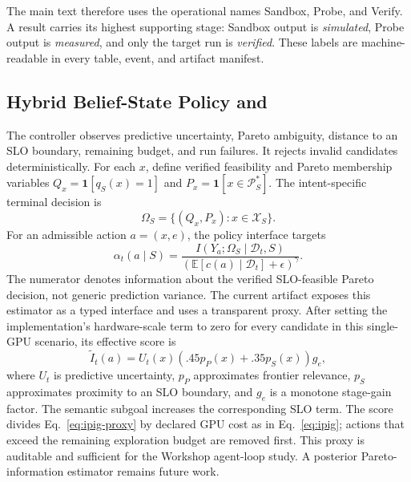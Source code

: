 The main text therefore uses the operational names Sandbox, Probe, and Verify.
A result carries its highest supporting stage: Sandbox output is
\emph{simulated}, Probe output is \emph{measured}, and only the target run is
\emph{verified}.  These labels are machine-readable in every table, event, and
artifact manifest.

\subsection{Hybrid Belief-State Policy and \ipig{}}

The controller observes predictive uncertainty, Pareto ambiguity, distance to
an SLO boundary, remaining budget, and run failures.  It rejects invalid
candidates deterministically.  For each $x$, define verified feasibility and
Pareto membership variables $Q_x=\mathbf 1[q_S(x)=1]$ and
$P_x=\mathbf 1[x\in\mathcal P_S^*]$.  The intent-specific terminal decision is
\begin{equation}
\Omega_S=\{(Q_x,P_x):x\in\mathcal X_S\}.
\end{equation}
For an admissible action $a=(x,e)$, the policy interface targets
\begin{equation}
\alpha_t(a\mid S)=
\frac{I(Y_a;\Omega_S\mid\mathcal D_t,S)}
{(\mathbb E[c(a)\mid\mathcal D_t]+\epsilon)^\gamma}.
\label{eq:ipig}
\end{equation}
The numerator denotes information about the verified SLO-feasible Pareto
decision, not generic prediction variance.  The current artifact exposes this
estimator as a typed interface and uses a transparent proxy.  After setting the
implementation's hardware-scale term to zero for every candidate in this
single-GPU scenario, its effective score is
\begin{equation}
\widetilde I_t(a)=U_t(x)
\left(.45p_{P}(x)+.35p_{S}(x)\right)g_e,
\label{eq:ipig-proxy}
\end{equation}
where $U_t$ is predictive uncertainty, $p_P$ approximates frontier relevance,
$p_S$ approximates proximity to an SLO boundary, and $g_e$ is a monotone
stage-gain factor.  The semantic subgoal increases the corresponding SLO term.
The score divides Eq.~\ref{eq:ipig-proxy} by declared GPU cost as in
Eq.~\ref{eq:ipig}; actions that exceed the remaining exploration budget are
removed first.  This proxy is auditable and sufficient for the Workshop
agent-loop study.  A posterior Pareto-information estimator remains future
work.


